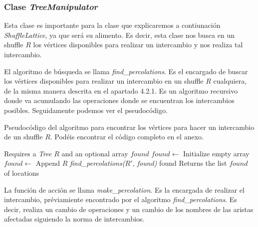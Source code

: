 \documentclass[../main.tex]{subfiles}
\begin{document}
\subsubsection*{Clase \emph{TreeManipulator}}
Esta clase es importante para la clase que explicaremos a contiunaci\'on \emph{ShuffleLattice}, ya que ser\'a su alimento. Es decir, esta clase nos busca en un shuffle $R$ los v\'ertices disponibles para realizar un intercambio y nos realiza tal intercambio.

El algoritmo de b\'usqueda se llama \emph{find\_percolations}. Es el encargado de buscar los v\'ertices disponibles para realizar un intercambio en un shuffle $R$ cualquiera, de la misma manera descrita en el apartado 4.2.1.
Es un algoritmo recursivo donde va acumulando las operaciones donde se encuentran los intercambios posibles. Seguidamente podemos ver el pseudoc\'odigo.

\begin{algoritmo}
    \caption{Pseudoc\'odigo del algoritmo para encontrar los v\'ertices para hacer un intercambio de un shuffle $R$. Pod\'eis encontrar el c\'odigo completo en el anexo.}
    \begin{algorithmic}[1]
        \Require Requires a \emph{Tree} $R$ and an optional array $found$
         
        \State $found \leftarrow$ Initialize empty array
        \EndIf
         
        \State\Break
        \EndIf
        \EndFor
        \ForElse {}
        \State $found\leftarrow$ Append $R$
        \EndForElse
        \EndIf
        \State\emph{find\_percolations($R'$, found)} 
        \EndFor
        \State\Return found
        \EndFunction
        \Ensure Returns the list $found$ of locations
    \end{algorithmic}
\end{algoritmo}

La funci\'on de acci\'on se llama \emph{make\_percolation}. Es la encargada de realizar el intercambio, pr\'eviamiente encontrado por el algoritmo \emph{find\_percolations}. Es decir, realiza un cambio de operaciones y un cambio de los nombres de las aristas afectadas siguiendo la norma de intercambios.
\end{document}
